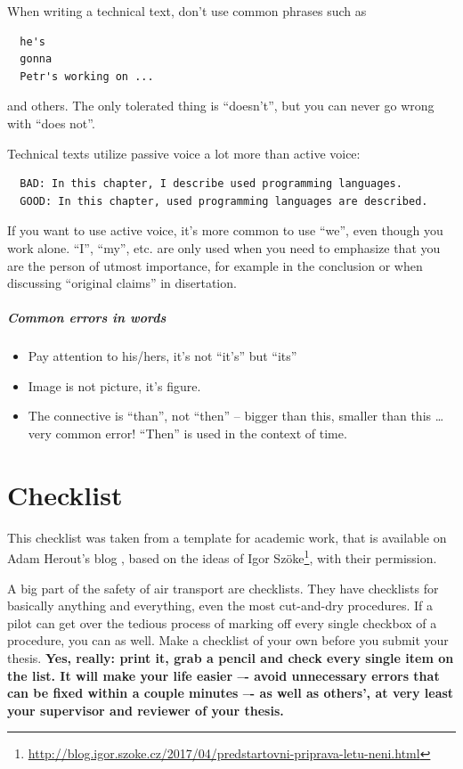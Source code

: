 When writing a technical text, don't use common phrases such as
\begin{verbatim}
  he's
  gonna
  Petr's working on ...
\end{verbatim}
\noindent and others. The only tolerated thing is ``doesn't'', but you can never go wrong with ``does not''.

\begin{samepage}
\noindent Technical texts utilize passive voice a lot more than active voice: 
\begin{verbatim}
  BAD: In this chapter, I describe used programming languages. 
  GOOD: In this chapter, used programming languages are described.
\end{verbatim}
\end{samepage}

If you want to use active voice, it's more common to use ``we'', even though you work alone. ``I'', ``my'', etc. are only used when you need to emphasize that you are the person of utmost importance, for example in the conclusion or when discussing ``original claims'' in disertation.


\paragraph{Common errors in words}

\begin{itemize}
  \item{Pay attention to his/hers, it's not ``it's'' but ``its''}
  \item{Image is not picture, it's figure.}
  \item{The connective is ``than'', not ``then'' -- bigger than this, smaller than this \ldots very common error! ``Then'' is used in the context of time.}
\end{itemize}


\chapter{Checklist}
\label{checklist}
This checklist was taken from a template for academic work, that is available on Adam Herout's blog \cite{Herout}, based on the ideas of Igor Szöke\footnote{\url{http://blog.igor.szoke.cz/2017/04/predstartovni-priprava-letu-neni.html}}, with their permission.

A big part of the safety of air transport are checklists. They have checklists for basically anything and everything, even the most cut-and-dry procedures. If a pilot can get over the tedious process of marking off every single checkbox of a procedure, you can as well. Make a checklist of your own before you submit your thesis. \bf Yes, really: \rm print it, grab a pencil and check every single item on the list. It will make your life easier –- avoid unnecessary errors that can be fixed within a couple minutes –- as well as others', at very least your supervisor and reviewer of your thesis.

